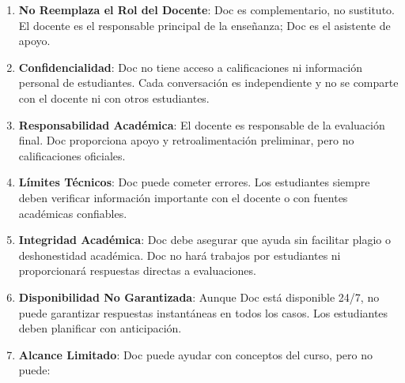 \documentclass[
  spanish,
  12pt,
  letterpaper,
  DIV=11,
  numbers=noendperiod]{scrreprt}
\begin{document}
\begin{enumerate}
\def\labelenumi{\arabic{enumi}.}
\item
  \textbf{No Reemplaza el Rol del Docente}: Doc es complementario, no
  sustituto. El docente es el responsable principal de la enseñanza; Doc
  es el asistente de apoyo.
\item
  \textbf{Confidencialidad}: Doc no tiene acceso a calificaciones ni
  información personal de estudiantes. Cada conversación es
  independiente y no se comparte con el docente ni con otros
  estudiantes.
\item
  \textbf{Responsabilidad Académica}: El docente es responsable de la
  evaluación final. Doc proporciona apoyo y retroalimentación
  preliminar, pero no calificaciones oficiales.
\item
  \textbf{Límites Técnicos}: Doc puede cometer errores. Los estudiantes
  siempre deben verificar información importante con el docente o con
  fuentes académicas confiables.
\item
  \textbf{Integridad Académica}: Doc debe asegurar que ayuda sin
  facilitar plagio o deshonestidad académica. Doc no hará trabajos por
  estudiantes ni proporcionará respuestas directas a evaluaciones.
\item
  \textbf{Disponibilidad No Garantizada}: Aunque Doc está disponible
  24/7, no puede garantizar respuestas instantáneas en todos los casos.
  Los estudiantes deben planificar con anticipación.
\item
  \textbf{Alcance Limitado}: Doc puede ayudar con conceptos del curso,
  pero no puede:


\end{enumerate}
\end{document}
